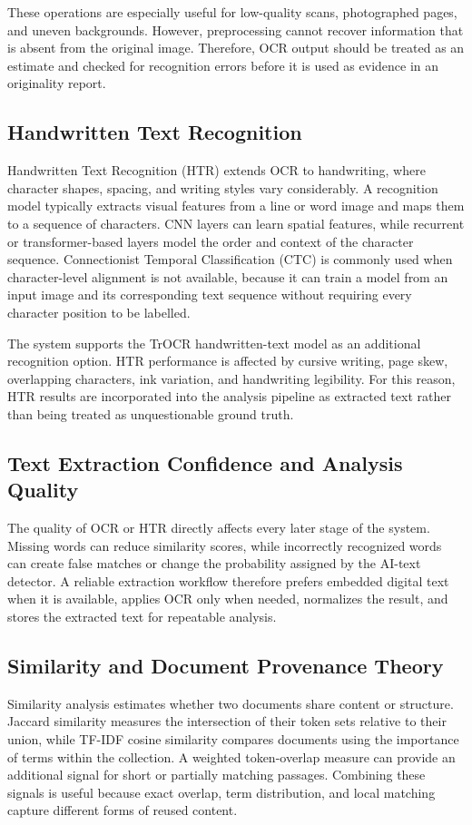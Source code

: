 \documentclass[12pt, a4paper]{report}
\numberwithin{equation}{chapter}
\begin{document}
These operations are especially useful for low-quality scans, photographed pages, and uneven backgrounds. However, preprocessing cannot recover information that is absent from the original image. Therefore, OCR output should be treated as an estimate and checked for recognition errors before it is used as evidence in an originality report.

\subsection{Handwritten Text Recognition}
Handwritten Text Recognition (HTR) extends OCR to handwriting, where character shapes, spacing, and writing styles vary considerably. A recognition model typically extracts visual features from a line or word image and maps them to a sequence of characters. CNN layers can learn spatial features, while recurrent or transformer-based layers model the order and context of the character sequence. Connectionist Temporal Classification (CTC) is commonly used when character-level alignment is not available, because it can train a model from an input image and its corresponding text sequence without requiring every character position to be labelled.

The system supports the TrOCR handwritten-text model as an additional recognition option. HTR performance is affected by cursive writing, page skew, overlapping characters, ink variation, and handwriting legibility. For this reason, HTR results are incorporated into the analysis pipeline as extracted text rather than being treated as unquestionable ground truth.

\subsection{Text Extraction Confidence and Analysis Quality}
The quality of OCR or HTR directly affects every later stage of the system. Missing words can reduce similarity scores, while incorrectly recognized words can create false matches or change the probability assigned by the AI-text detector. A reliable extraction workflow therefore prefers embedded digital text when it is available, applies OCR only when needed, normalizes the result, and stores the extracted text for repeatable analysis.

\subsection{Similarity and Document Provenance Theory}
Similarity analysis estimates whether two documents share content or structure. Jaccard similarity measures the intersection of their token sets relative to their union, while TF-IDF cosine similarity compares documents using the importance of terms within the collection. A weighted token-overlap measure can provide an additional signal for short or partially matching passages. Combining these signals is useful because exact overlap, term distribution, and local matching capture different forms of reused content.
\end{document}
